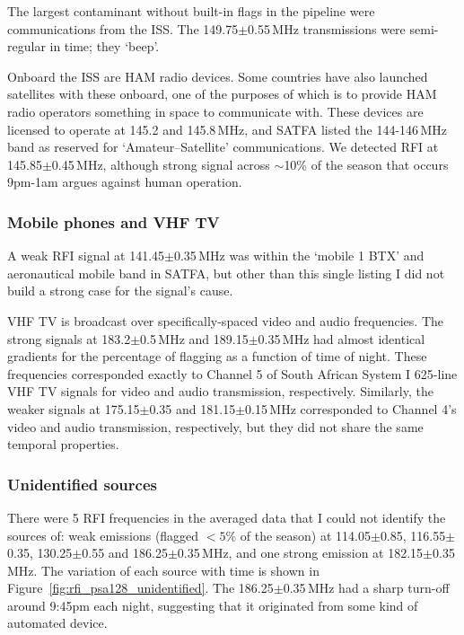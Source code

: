 The largest contaminant without built-in flags in the pipeline were communications from the ISS. The 149.75$\pm$0.55\,MHz transmissions were semi-regular in time; they `beep'. 

Onboard the ISS are HAM radio devices. Some countries have also launched satellites with these onboard, one of the purposes of which is to provide HAM radio operators something in space to communicate with. These devices are licensed to operate at 145.2 and 145.8\,MHz, and SATFA listed the 144-146\,MHz band as reserved for `Amateur--Satellite' communications. We detected RFI at 145.85$\pm$0.45\,MHz, although strong signal across $\sim$10\% of the season that occurs 9pm-1am argues against human operation.

\subsubsection*{Mobile phones and VHF TV}
A weak RFI signal at 141.45$\pm$0.35\,MHz was within the `mobile 1 BTX'  and aeronautical mobile band in SATFA, but other than this single listing I did not build a strong case for the signal's cause.

VHF TV is broadcast over specifically-spaced video and audio frequencies. The strong signals at 183.2$\pm$0.5\,MHz and 189.15$\pm$0.35\,MHz had almost identical gradients for the percentage of flagging as a function of time of night. These frequencies corresponded exactly to Channel 5 of South African System I 625-line VHF TV signals for video and audio transmission, respectively. Similarly, the weaker signals at 175.15$\pm$0.35	 and 181.15$\pm$0.15\,MHz corresponded to Channel 4's video and audio transmission, respectively, but they did not share the same temporal properties.

\subsubsection*{Unidentified sources}

There were 5 RFI frequencies in the averaged data that I could not identify the sources of:  weak emissions (flagged $<5\%$ of the season) at 114.05$\pm$0.85, 116.55$\pm$0.35, 130.25$\pm$0.55 and 186.25$\pm$0.35\,MHz, and one strong emission at 182.15$\pm$0.35\,MHz. The variation of each source with time is shown in Figure~\ref{fig:rfi_psa128_unidentified}. The 186.25$\pm$0.35\,MHz had a sharp turn-off around 9:45pm each night, suggesting that it originated from some kind of automated device.

